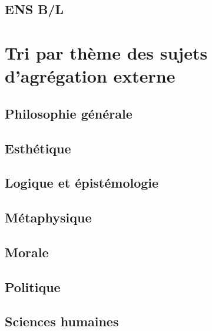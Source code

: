 \documentclass[a4paper,12pt]{article}
\begin{document}
\noindent


\subsection{ENS B​/​L}
\label{sec:org184f523}

\noindent


\section{Tri par thème des sujets d'agrégation externe}
\label{sec:org13d5862}
\subsection{Philosophie générale}
\label{sec:org8a29126}

\noindent


\subsection{Esthétique}
\label{sec:org9adbe09}

\noindent


\subsection{Logique et épistémologie}
\label{sec:org32fada4}

\noindent


\subsection{Métaphysique}
\label{sec:org292c149}

\noindent


\subsection{Morale}
\label{sec:orgb0b18d8}

\noindent


\subsection{Politique}
\label{sec:org6a33845}

\noindent


\subsection{Sciences humaines}
\label{sec:orgf1a7274}
\end{document}
